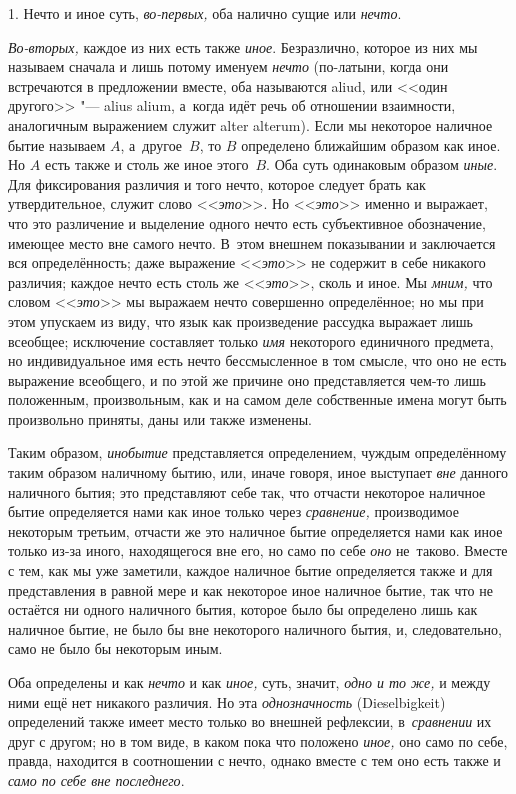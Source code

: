 1. Нечто и иное суть, {\em во-первых,} оба налично сущие или {\em нечто}.

{\em Во-вторых,} каждое из них есть также {\em иное}. Безразлично, которое из
них мы называем сначала и лишь потому именуем {\em нечто} (по-латыни, когда они
встречаются в предложении вместе, оба называются aliud, или <<один другого>>
"--- alius alium, а~когда идёт речь об отношении взаимности, аналогичным
выражением служит alter alterum). Если мы некоторое наличное бытие называем
$A$, а~другое~$B$, то $B$ определено ближайшим образом как иное. Но $A$ есть
также и столь же иное этого~$B$. Оба суть одинаковым образом {\em иные}. Для
фиксирования различия и того нечто, которое следует брать как утвердительное,
служит слово <<{\em это}>>. Но <<{\em это}>> именно и выражает, что это
различение и выделение одного нечто есть субъективное обозначение, имеющее
место вне самого нечто. В~этом внешнем показывании и заключается вся
определённость; даже выражение <<{\em это}>> не содержит в себе никакого
различия; каждое нечто есть столь же <<{\em это}>>, сколь и иное. Мы
{\em мним,} что словом <<{\em это}>> мы выражаем нечто совершенно определённое;
но мы при этом упускаем из виду, что язык как произведение рассудка выражает
лишь всеобщее; исключение составляет только {\em имя} некоторого единичного
предмета, но индивидуальное имя есть нечто бессмысленное в том смысле, что оно
не есть выражение всеобщего, и по этой же причине оно представляется чем-то
лишь положенным, произвольным, как и на самом деле собственные имена могут быть
произвольно приняты, даны или также изменены.

Таким образом, {\em инобытие} представляется определением, чуждым определённому
таким образом наличному бытию, или, иначе говоря, иное выступает {\em вне}
данного наличного бытия; это представляют себе так, что отчасти некоторое
наличное бытие определяется нами как иное только через {\em сравнение,}
производимое некоторым третьим, отчасти же это наличное бытие определяется нами
как иное только из-за иного, находящегося вне его, но само по себе {\em оно}
не~таково. Вместе с тем, как мы уже заметили, каждое наличное бытие
определяется также и для представления в равной мере и как некоторое иное
наличное бытие, так что не остаётся ни одного наличного бытия, которое было бы
определено лишь как наличное бытие, не было бы вне некоторого наличного бытия,
и, следовательно, само не было бы некоторым иным.

Оба определены и как {\em нечто} и как {\em иное,} суть, значит,
{\em одно и то же,} и между ними ещё нет никакого различия. Но эта
{\em однозначность} (Diesel\-bigkeit) определений также имеет место только во
внешней рефлексии, в~{\em сравнении} их друг с другом; но в том виде, в каком
пока что положено {\em иное,} оно само по себе, правда, находится в соотношении
с нечто, однако вместе с тем оно есть также и
{\em само по себе вне последнего}.

